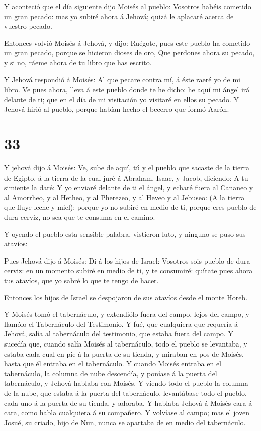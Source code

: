  Y aconteció que el día siguiente dijo Moisés al pueblo:
Vosotros habéis cometido un gran pecado: mas yo subiré ahora á Jehová;
quizá le aplacaré acerca de vuestro pecado.

 Entonces volvió Moisés á Jehová, y dijo: Ruégote, pues
este pueblo ha cometido un gran pecado, porque se hicieron dioses de
oro,  Que perdones ahora su pecado, y si no, ráeme ahora de
tu libro que has escrito.

 Y Jehová respondió á Moisés: Al que pecare contra mí, á
éste raeré yo de mi libro.  Ve pues ahora, lleva á este
pueblo donde te he dicho: he aquí mi ángel irá delante de ti; que en el
día de mi visitación yo visitaré en ellos su pecado.  Y
Jehová hirió al pueblo, porque habían hecho el becerro que formó Aarón.

\hypertarget{section-32}{%
\section{33}\label{section-32}}

 Y jehová dijo á Moisés: Ve, sube de aquí, tú y el pueblo
que sacaste de la tierra de Egipto, á la tierra de la cual juré á
Abraham, Isaac, y Jacob, diciendo: A tu simiente la daré:  Y
yo enviaré delante de ti el ángel, y echaré fuera al Cananeo y al
Amorrheo, y al Hetheo, y al Pherezeo, y al Heveo y al Jebuseo:
 (A la tierra que fluye leche y miel); porque yo no subiré
en medio de ti, porque eres pueblo de dura cerviz, no sea que te consuma
en el camino.

 Y oyendo el pueblo esta sensible palabra, vistieron luto, y
ninguno se puso sus atavíos:

 Pues Jehová dijo á Moisés: Di á los hijos de Israel:
Vosotros sois pueblo de dura cerviz: en un momento subiré en medio de
ti, y te consumiré: quítate pues ahora tus atavíos, que yo sabré lo que
te tengo de hacer.

 Entonces los hijos de Israel se despojaron de sus atavíos
desde el monte Horeb.

 Y Moisés tomó el tabernáculo, y extendiólo fuera del campo,
lejos del campo, y llamólo el Tabernáculo del Testimonio. Y fué, que
cualquiera que requería á Jehová, salía al tabernáculo del testimonio,
que estaba fuera del campo.  Y sucedía que, cuando salía
Moisés al tabernáculo, todo el pueblo se levantaba, y estaba cada cual
en pie á la puerta de su tienda, y miraban en pos de Moisés, hasta que
él entraba en el tabernáculo.  Y cuando Moisés entraba en el
tabernáculo, la columna de nube descendía, y poníase á la puerta del
tabernáculo, y Jehová hablaba con Moisés.  Y viendo todo el
pueblo la columna de la nube, que estaba á la puerta del tabernáculo,
levantábase todo el pueblo, cada uno á la puerta de su tienda, y
adoraba.  Y hablaba Jehová á Moisés cara á cara, como habla
cualquiera á su compañero. Y volvíase al campo; mas el joven Josué, su
criado, hijo de Nun, nunca se apartaba de en medio del tabernáculo.

